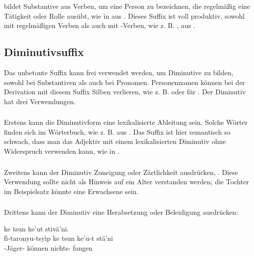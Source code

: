 \subsubsection{}  bildet Substantive aus Verben, um eine Person zu bezeichnen, die regelmäßig eine Tätigkeit oder Rolle ausübt, wie in   aus  . Dieses Suffix ist voll produktiv, sowohl mit regelmäßigen Verben als auch mit -Verben, wie z. B.  , aus  .

\subsection{Diminutivsuffix} Das unbetonte Suffix  kann frei verwendet werden, um Diminutive zu bilden, sowohl bei Substantiven als auch bei Pronomen. Personennamen können bei der Derivation mit diesem Suffix Silben verlieren, wie z. B.  oder  für . Der Diminutiv hat drei Verwendungen.
\label{lingop:dimin}

\subsubsection{} Erstens kann die Diminutivform eine lexikalisierte Ableitung sein. Solche Wörter finden sich im Wörterbuch, wie z. B.   aus  . Das Suffix ist hier semantisch so schwach, dass man das Adjektiv   mit einem lexikalisierten Diminutiv ohne Widerspruch verwenden kann, wie in  .

\subsubsection{} Zweitens kann der Diminutiv Zuneigung oder Zärtlichkeit ausdrücken,  . Diese Verwendung sollte nicht als Hinweis auf ein Alter verstanden werden; die Tochter im Beispielsatz könnte eine Erwachsene sein.

\subsubsection{} Drittens kann der Diminutiv eine Herabsetzung oder Beleidigung ausdrücken: 
\begin{interlin}
	\glll \Npawl{} ke tsun ke'ut stivä'ni. \\
	fì-taronyu-tsyìp ke tsun ke'u-t stä'ni \\
	-Jäger-  können nichts- fangen \\
\end{interlin}

